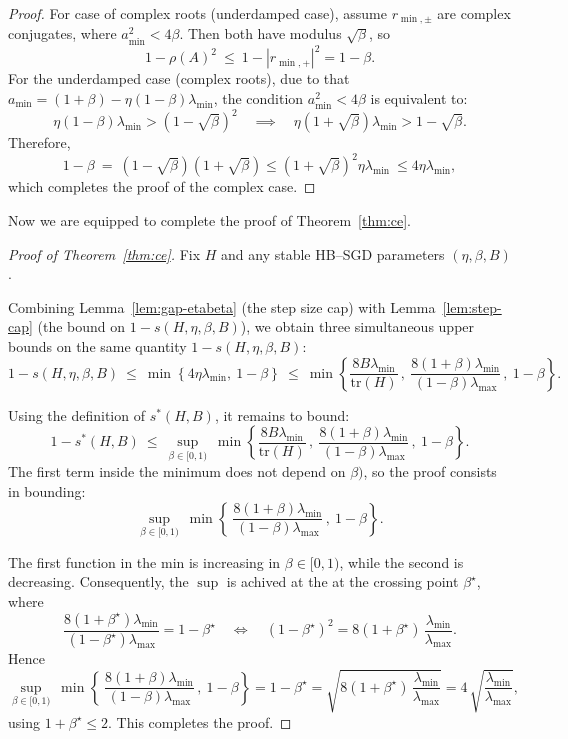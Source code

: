 \documentclass{article}
\begin{document}
\begin{proof}
For case of complex roots (underdamped case),
assume $r_{\min,\pm}$ are complex conjugates, where $a_{\min}^2<4\beta$.
Then both have modulus
$\sqrt{\beta}$, so
\[
1 - \rho(A)^2
\ \le\ 1 - |r_{\min,+}|^2
= 1 - \beta.
\]
For the underdamped case (complex roots), due to that
$a_{\min}=(1+\beta)-\eta(1-\beta)\lambda_{\min}$, the condition
$a_{\min}^2<4\beta$ is equivalent to:
\[
  \eta(1-\beta)\lambda_{\min}  > (1-\sqrt{\beta})^2
\quad  \implies \quad
\eta(1+\sqrt{\beta})\lambda_{\min}  > 1-\sqrt{\beta}.
\]
Therefore,
\[
1-\beta \ =\ (1-\sqrt{\beta})(1+\sqrt{\beta})
\leq (1+\sqrt{\beta})^2\eta\lambda_{\min} \ \leq 4\eta\lambda_{\min},
\]
which completes the proof of the complex case.
\end{proof}

Now we are equipped to complete the proof of Theorem~\ref{thm:ce}.

\begin{proof}[Proof of Theorem~\ref{thm:ce}]
Fix $H$ and any stable HB--SGD parameters $(\eta,\beta,B)$.


Combining Lemma~\ref{lem:gap-etabeta} (the step size cap) with
Lemma~\ref{lem:step-cap} (the bound on $1-s(H,\eta,\beta,B)$), we
obtain three simultaneous upper bounds on the same quantity $1-s(H,\eta,\beta,B)$:
\[
1 - s(H,\eta,\beta,B)
\ \le\
\min\!\left\{
4\eta\lambda_{\min},\ 1-\beta
\right\}
\ \le\
\min\!\left\{
\frac{8B\lambda_{\min}}{\mathrm{tr}(H)}\,,\
\frac{8(1+\beta)\lambda_{\min}}{(1-\beta)\lambda_{\max}}\,,\
1-\beta
\right\}.
\]

Using the definition of $s^*(H,B) $, it remains to bound:
\[
1 - s^*(H,B)
\ \le\
 \sup_{\beta\in[0,1)} \ 
\min\!\left\{
\frac{8B\lambda_{\min}}{\mathrm{tr}(H)}\,,\
\frac{8(1+\beta)\lambda_{\min}}{(1-\beta)\lambda_{\max}}\,,\
1-\beta
\right\}.
\]  
The first term inside the minimum does not depend on $\beta)$, so the
proof consists in bounding:
\[
\sup_{\beta\in[0,1)} \ 
\min\!\left\{ \
\frac{8(1+\beta)\lambda_{\min}}{(1-\beta)\lambda_{\max}}\,,\
1-\beta
\right\}.
\]

The first function in the min is increasing in $\beta\in[0,1)$, while
the second is decreasing. Consequently, the $\sup$ is achived at the
at the crossing point $\beta^\star$, where
\[
\frac{8(1+\beta^\star)\lambda_{\min}}{(1-\beta^\star)\lambda_{\max}}
= 1-\beta^\star
\quad\Longleftrightarrow\quad
(1-\beta^\star)^2
= 8(1+\beta^\star)\,\frac{\lambda_{\min}}{\lambda_{\max}}.
\]
Hence
\[
  \sup_{\beta\in[0,1)} \ 
\min\!\left\{ \
\frac{8(1+\beta)\lambda_{\min}}{(1-\beta)\lambda_{\max}}\,,\
1-\beta
\right\} =
1-\beta^\star
= \sqrt{8(1+\beta^\star)\,\frac{\lambda_{\min}}{\lambda_{\max}}}
= 4\,\sqrt{\frac{\lambda_{\min}}{\lambda_{\max}}},
\]
using $1+\beta^\star\le 2$. This completes the proof.
\end{proof}
\end{document}
